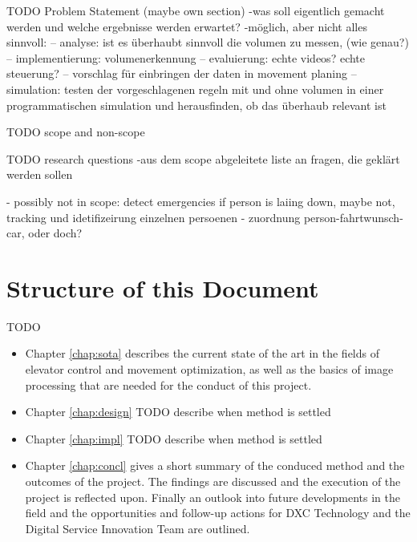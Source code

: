 TODO Problem Statement (maybe own section)
-was soll eigentlich gemacht werden und welche ergebnisse werden erwartet?
-möglich, aber nicht alles sinnvoll: 
-- analyse: ist es überhaubt sinnvoll die volumen zu messen, (wie genau?)
-- implementierung: volumenerkennung
-- evaluierung: echte videos? echte steuerung?
-- vorschlag für einbringen der daten in movement planing
-- simulation: testen der vorgeschlagenen regeln mit und ohne volumen in einer programmatischen simulation und herausfinden, ob das überhaub relevant ist

TODO scope and non-scope

TODO research questions
-aus dem scope abgeleitete liste an fragen, die geklärt werden sollen

- possibly not in scope: detect emergencies if person is laiing down, maybe not, tracking und idetifizeirung einzelnen persoenen
- zuordnung person-fahrtwunsch-car, oder doch?


\section{Structure of this Document}

TODO

\begin{itemize}
    \item Chapter \ref{chap:sota} describes the current state of the art in the fields of elevator control and movement optimization, as well as the basics of image processing that are needed for the conduct of this project.
    \item Chapter \ref{chap:design} TODO describe when method is settled
    \item Chapter \ref{chap:impl} TODO describe when method is settled
    \item Chapter \ref{chap:concl} gives a short summary of the conduced method and the outcomes of the project. The findings are discussed and the execution of the project is reflected upon. Finally an outlook into future developments in the field and the opportunities and follow-up actions for DXC Technology and the Digital Service Innovation Team are outlined.
\end{itemize}